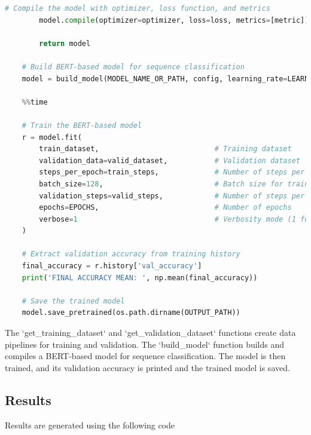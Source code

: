 \documentclass{solutionclass} %
\begin{document}
\begin{solution}
\begin{lstlisting}[language=Python, basicstyle=\ttfamily\footnotesize, keywordstyle=\color{blue}, commentstyle=\color{gray}]
        # Compile the model with optimizer, loss function, and metrics
        model.compile(optimizer=optimizer, loss=loss, metrics=[metric])
    
        return model
    
    # Build BERT-based model for sequence classification
    model = build_model(MODEL_NAME_OR_PATH, config, learning_rate=LEARNING_RATE)
    
    %%time
    
    # Train the BERT-based model
    r = model.fit(
        train_dataset,                           # Training dataset
        validation_data=valid_dataset,           # Validation dataset
        steps_per_epoch=train_steps,             # Number of steps per epoch for training
        batch_size=128,                          # Batch size for training
        validation_steps=valid_steps,            # Number of steps per epoch for validation
        epochs=EPOCHS,                           # Number of epochs
        verbose=1                                # Verbosity mode (1 for progress bar)
    )
    
    # Extract validation accuracy from training history
    final_accuracy = r.history['val_accuracy']
    print('FINAL ACCURACY MEAN: ', np.mean(final_accuracy))
    
    # Save the trained model
    model.save_pretrained(os.path.dirname(OUTPUT_PATH))
    \end{lstlisting}
    
    The `get\_training\_dataset` and `get\_validation\_dataset` functions create data pipelines for training and validation. The `build\_model` function builds and compiles a BERT-based model for sequence classification. The model is then trained, and its validation accuracy is printed and the trained model is saved.
\end{solution}



\subsection{Results}

Results are generated using the following code
\end{document}
